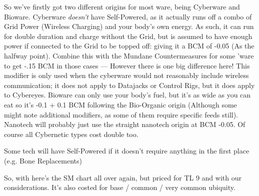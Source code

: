 	So we've firstly got two different origins for most ware, being Cyberware and Bioware. Cyberware \textit{doesn't} have Self-Powered, as it actually runs off a combo of Grid Power (Wireless Charging) and your body's own energy. As such, it can run for double duration and charge without the Grid, but is assumed to have enough power if connected to the Grid to be topped off: giving it a BCM of -0.05 (As the halfway point). Combine this with the Mundane Countermeasures for some 'ware to get -.15 BCM in those cases — However there is one big difference here! This modifier is only used when the cyberware would not reasonably include wireless communication; it does not apply to Datajacks or Control Rigs, but it does apply to Cybereyes. Bioware can only use your body's fuel, but it's as wide as you can eat so it's -0.1 + 0.1 BCM following the Bio-Organic origin (Although some might note additional modifiers, as some of them require specific feeds still). Nanotech will probably just use the straight nanotech origin at BCM -0.05. Of course all Cybernetic types cost double too.
	
	Some tech will have Self-Powered if it doesn't require anything in the first place (e.g. Bone Replacements)
	
	So, with here's the SM chart all over again, but priced for TL 9 and with our considerations. It's also costed for base / common / very common ubiquity.
	
